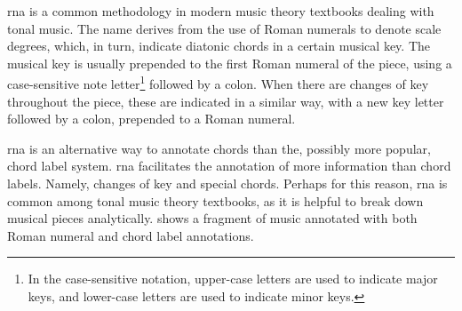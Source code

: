 

\gls{rna} is a common methodology in modern music theory
textbooks dealing with tonal music. The name derives from
the use of Roman numerals to denote scale degrees, which, in
turn, indicate diatonic chords in a certain musical key. The
musical key is usually prepended to the first Roman numeral
of the piece, using a case-sensitive note letter\footnote{In
the case-sensitive notation, upper-case letters are used to
indicate major keys, and lower-case letters are used to
indicate minor keys.} followed by a colon. When there are
changes of key throughout the piece, these are indicated in
a similar way, with a new key letter followed by a colon,
prepended to a Roman numeral.

\gls{rna} is an alternative way to annotate chords than the,
possibly more popular, chord label system. \gls{rna}
facilitates the annotation of more information than chord
labels. Namely, changes of key and special chords. Perhaps
for this reason, \gls{rna} is common among tonal music
theory textbooks, as it is helpful to break down musical
pieces analytically.  shows a fragment of
music annotated with both Roman numeral and chord label
annotations.

